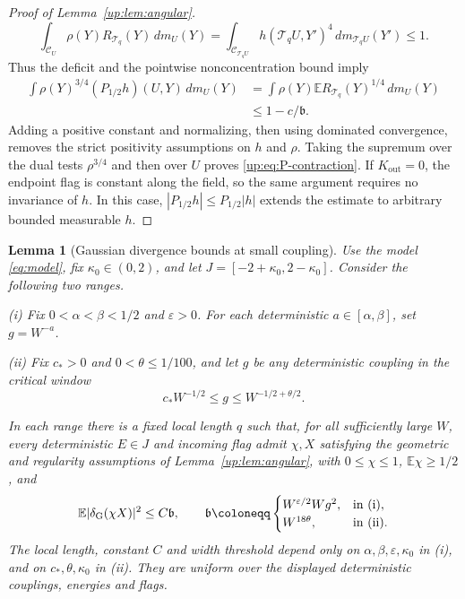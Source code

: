 \documentclass[11pt]{article}
\numberwithin{equation}{section}
\newtheorem{lemma}[theorem]{Lemma}
\theoremstyle{remark}
\newcommand{\E}{\mathbb E}
\begin{document}
\begin{proof}[Proof of Lemma~\ref{up:lem:angular}]
\[
 \int_{\mathcal C_U}\rho(Y)R_{\mathcal T_q}(Y)\,dm_U(Y)
 =\int_{\mathcal C_{\mathcal T_q U}}h(\mathcal T_q U,Y')^4\,dm_{\mathcal T_q U}(Y')\le1.
\]
Thus the deficit and the pointwise nonconcentration bound imply
\[
 \begin{aligned}
 \int\rho(Y)^{3/4}(P_{1/2}h)(U,Y)\,dm_U(Y)
 &=\int\rho(Y)\E R_{\mathcal T_q}(Y)^{1/4}\,dm_U(Y)\\
 &\le1-c/\mathfrak b.
 \end{aligned}
\]
Adding a positive constant and normalizing, then using dominated
convergence, removes the strict positivity assumptions on $h$ and $\rho$.
Taking the supremum over the dual tests $\rho^{3/4}$ and then over $U$
proves \eqref{up:eq:P-contraction}.
If $K_{\mathrm{out}}=0$, the endpoint flag is constant along the field,
so the same argument requires no invariance of $h$. In this case,
$|P_{1/2}h|\le P_{1/2}|h|$ extends the estimate to arbitrary bounded
measurable $h$.
\end{proof}

\begin{lemma}[Gaussian divergence bounds at small coupling]
\label{up:lem:small-contraction}
Use the model \eqref{eq:model}, fix $\kappa_0\in(0,2)$, and let
$J=[-2+\kappa_0,2-\kappa_0]$. Consider the following two ranges.

\noindent\textup{(i)} Fix $0<\alpha<\beta<1/2$ and $\varepsilon>0$.
For each deterministic $a\in[\alpha,\beta]$, set $g=W^{-a}$.

\noindent\textup{(ii)} Fix $c_*>0$ and $0<\theta\le1/100$, and let
$g$ be any deterministic coupling in the critical window
\begin{equation}\label{eq:critical-window}
 c_*W^{-1/2}\le g\le W^{-1/2+\theta/2}.
\end{equation}

In each range there is a fixed local length $q$ such that, for all
sufficiently large $W$, every deterministic $E\in J$ and incoming
flag admit $\chi,X$ satisfying the geometric and regularity assumptions
of Lemma~\ref{up:lem:angular}, with $0\le\chi\le1$, $\E\chi\ge1/2$, and
\begin{equation}\label{up:eq:small-transfer-scales}
 \E|\delta_{\rm G}(\chi X)|^2\le C\mathfrak b,
 \qquad \mathfrak b\coloneqq
 \begin{cases}
 W^{\varepsilon/2}Wg^2,&\text{in (i)},\\
 W^{18\theta},&\text{in (ii)}.
 \end{cases}
\end{equation}
The local length, constant $C$ and width threshold depend only on
$\alpha,\beta,\varepsilon,\kappa_0$ in (i), and on
$c_*,\theta,\kappa_0$ in (ii). They are uniform over the displayed
deterministic couplings, energies and flags.
\end{lemma}
\end{document}
